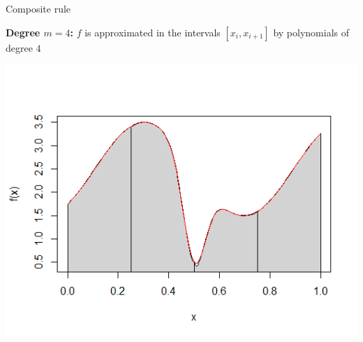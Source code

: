 \begin{vbframe}{Composite rule}

\framebreak

\textbf{Degree $m = 4$:} $f$ is approximated in the intervals $[x_i, x_{i + 1}]$ by polynomials of degree $4$

\begin{center}
\includegraphics[width = .7\textwidth]{figure_man/deg7.png}
\end{center}


%
%

\end{vbframe}













